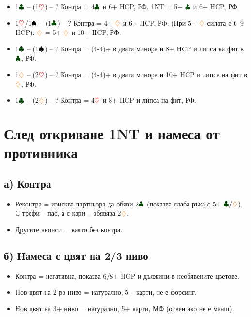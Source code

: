\documentclass[10pt,a5paper]{extarticle}
\newcommand{\Rheart}{\textcolor{red}{\heartsuit}}
\newcommand{\Rdiamond}{\textcolor{orange}{\diamondsuit}}
\newcommand{\Bspade}{\textcolor{black}{\spadesuit}}
\newcommand{\Bclub}{\textcolor{darkgreen}{\clubsuit}}
\begin{document}
\begin{itemize}
  \item[] 1$\Bclub$ -- (1$\Rheart$) -- ?  
  \quad Контра = 4$\Bclub$ и 6+ HCP, РФ.  
  \quad 1NT = 5+ $\Bclub$ и 6+ HCP, РФ.

  \item[] 1$\Rheart$/1$\Bspade$ -- (1$\Bclub$) -- ?  
  \quad Контра = 4+ $\Rdiamond$ и 6+ HCP, РФ.  
  \quad (При 5+ $\Rdiamond$ силата е 6--9 HCP).  
  $\Rdiamond$ = 5+ $\Rdiamond$ и 10+ HCP, РФ.

  \item[] 1$\Bclub$ -- (1$\Bspade$) -- ?  
  \quad Контра = (4-4)+ в двата минора и 8+ HCP и липса на фит в $\Bclub$, РФ.

  \item[] 1$\Rdiamond$ -- (2$\Rheart$) -- ?  
  \quad Контра = (4-4)+ в двата минора и 10+ HCP и липса на фит в $\Rdiamond$, РФ.

  \item[] 1$\Bclub$ -- (2$\Rdiamond$) -- ?  
  \quad Контра = 4$\Rheart$ и 8+ HCP и липса на фит, РФ.
\end{itemize}

\section{След откриване 1NT и намеса от противника}

\subsection*{а) Контра}
\begin{itemize}
  \item[] Реконтра = изисква партньора да обяви 2$\Bclub$ (показва слаба ръка с 5+ $\Bclub/\Rdiamond$).  
  \quad С трефи -- пас, а с кари -- обявява 2$\Rdiamond$.
  \item[] Другите анонси = както без контра.
\end{itemize}

\subsection*{б) Намеса с цвят на 2/3 ниво}
\begin{itemize}
  \item[] Контра = негативна, показва 6/8+ HCP и дължини в необявените цветове.
  \item[] Нов цвят на 2-ро ниво = натурално, 5+ карти, не е форсинг.
  \item[] Нов цвят на 3+ ниво = натурално, 5+ карти, МФ (освен ако не е манш).
\end{itemize}
\newpage
\end{document}
